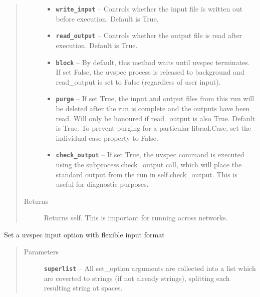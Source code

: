 \documentclass[a4paper,10pt,english]{sphinxmanual}
\begin{document}
\begin{fulllineitems}
\begin{fulllineitems}
\begin{quote}
\begin{description}
\begin{itemize}
\item {} 
\textbf{\texttt{write\_input}} -- Controls whether the input file is written out before execution. Default is True.

\item {} 
\textbf{\texttt{read\_output}} -- Controls whether the output file is read after execution. Default is True.

\item {} 
\textbf{\texttt{block}} -- By default, this method waits until uvspec terminates. If set False, the uvspec process
is released to background and read\_output is set to False (regardless of user input).

\item {} 
\textbf{\texttt{purge}} -- If set True, the input and output files from this run will be deleted after the run is complete
and the outputs have been read. Will only be honoured if read\_output is also True. Default is True.
To prevent purging for a particular librad.Case, set the individual case property to False.

\item {} 
\textbf{\texttt{check\_output}} -- If set True, the uvspec command is executed using the subprocess.check\_output call, which
will place the standard output from the run in self.check\_output. This is useful for diagnostic
purposes.

\end{itemize}

\item[{Returns}] \leavevmode
Returns self. This is important for running across networks.

\end{description}\end{quote}

\end{fulllineitems}


\begin{fulllineitems}
\label{packages:librad.Case.set_option}
Set a uvspec input option with flexible input format
\begin{quote}\begin{description}
\item[{Parameters}] \leavevmode
\textbf{\texttt{superlist}} -- All set\_option arguments are collected into a list which are coverted to strings
(if not already strings), splitting each resulting string at spaces.


\end{description}
\end{quote}
\end{fulllineitems}
\end{fulllineitems}
\end{document}

